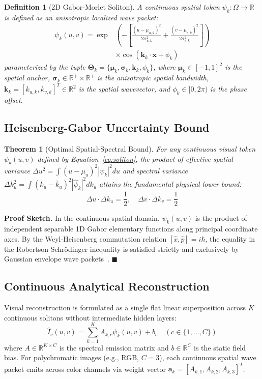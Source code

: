 \documentclass[10pt,twocolumn]{article}
\newtheorem{theorem}{Theorem}
\newtheorem{definition}{Definition}
\begin{document}
\begin{definition}[2D Gabor-Morlet Soliton]
A continuous spatial token $\psi_k: \Omega \to \mathbb{R}$ is defined as an anisotropic localized wave packet:
\begin{align}
    \psi_k(u, v) = \exp&\left(-\left[\frac{(u - \mu_{u,k})^2}{2\sigma_{u,k}^2} + \frac{(v - \mu_{v,k})^2}{2\sigma_{v,k}^2}\right]\right) \nonumber \\
    &\times \cos(\mathbf{k}_k \cdot \mathbf{x} + \phi_k)
    \label{eq:soliton}
\end{align}
parameterized by the tuple $\mathbf{\Theta}_k = \{\mathbf{\mu}_k, \mathbf{\sigma}_k, \mathbf{k}_k, \phi_k\}$, where $\mathbf{\mu}_k \in [-1, 1]^2$ is the spatial anchor, $\mathbf{\sigma}_k \in \mathbb{R}^+ \times \mathbb{R}^+$ is the anisotropic spatial bandwidth, $\mathbf{k}_k = [k_{u,k}, k_{v,k}]^T \in \mathbb{R}^2$ is the spatial wavevector, and $\phi_k \in [0, 2\pi)$ is the phase offset.
\end{definition}

\subsection{Heisenberg-Gabor Uncertainty Bound}
\begin{theorem}[Optimal Spatial-Spectral Bound]
For any continuous visual token $\psi_k(u, v)$ defined by Equation~\ref{eq:soliton}, the product of effective spatial variance $\Delta u^2 = \int (u - \mu_u)^2 |\psi_k|^2 du$ and spectral variance $\Delta k_u^2 = \int (k_u - \bar{k}_u)^2 |\hat{\psi}_k|^2 dk_u$ attains the fundamental physical lower bound:
\begin{equation}
    \Delta u \cdot \Delta k_u = \frac{1}{2}, \quad \Delta v \cdot \Delta k_v = \frac{1}{2}
\end{equation}
\end{theorem}
\textbf{Proof Sketch.} In the continuous spatial domain, $\psi_k(u, v)$ is the product of independent separable 1D Gabor elementary functions along principal coordinate axes. By the Weyl-Heisenberg commutation relation $[\hat{x}, \hat{p}] = i\hbar$, the equality in the Robertson-Schr\"odinger inequality is satisfied strictly and exclusively by Gaussian envelope wave packets~\cite{daugman1985uncertainty,gabor1946theory}. $\blacksquare$

\subsection{Continuous Analytical Reconstruction}
Visual reconstruction is formulated as a single flat linear superposition across $K$ continuous solitons without intermediate hidden layers:
\begin{equation}
    \hat{I}_c(u, v) = \sum_{k=1}^K A_{k, c} \psi_k(u, v) + b_c \quad (c \in \{1, \dots, C\})
    \label{eq:reconstruction}
\end{equation}
where $A \in \mathbb{R}^{K \times C}$ is the spectral emission matrix and $b \in \mathbb{R}^C$ is the static field bias. For polychromatic images (e.g., RGB, $C=3$), each continuous spatial wave packet emits across color channels via weight vector $\mathbf{a}_k = [A_{k, 1}, A_{k, 2}, A_{k, 3}]^T$.
\end{document}
